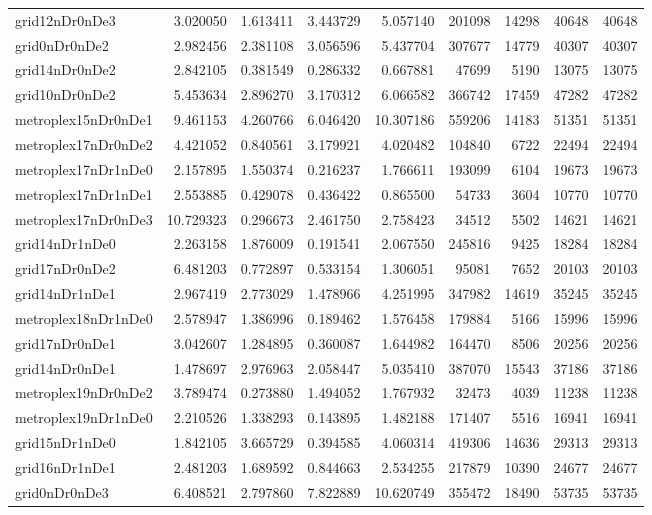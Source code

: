 \begin{longtable}{|l|r|r|r|r|r|r|r|r|}
grid12nDr0nDe3 & 3.020050 & 1.613411 & 3.443729 & 5.057140 & 201098 & 14298 & 40648 & 40648 \\
grid0nDr0nDe2 & 2.982456 & 2.381108 & 3.056596 & 5.437704 & 307677 & 14779 & 40307 & 40307 \\
grid14nDr0nDe2 & 2.842105 & 0.381549 & 0.286332 & 0.667881 & 47699 & 5190 & 13075 & 13075 \\
grid10nDr0nDe2 & 5.453634 & 2.896270 & 3.170312 & 6.066582 & 366742 & 17459 & 47282 & 47282 \\
metroplex15nDr0nDe1 & 9.461153 & 4.260766 & 6.046420 & 10.307186 & 559206 & 14183 & 51351 & 51351 \\
metroplex17nDr0nDe2 & 4.421052 & 0.840561 & 3.179921 & 4.020482 & 104840 & 6722 & 22494 & 22494 \\
metroplex17nDr1nDe0 & 2.157895 & 1.550374 & 0.216237 & 1.766611 & 193099 & 6104 & 19673 & 19673 \\
metroplex17nDr1nDe1 & 2.553885 & 0.429078 & 0.436422 & 0.865500 & 54733 & 3604 & 10770 & 10770 \\
metroplex17nDr0nDe3 & 10.729323 & 0.296673 & 2.461750 & 2.758423 & 34512 & 5502 & 14621 & 14621 \\
grid14nDr1nDe0 & 2.263158 & 1.876009 & 0.191541 & 2.067550 & 245816 & 9425 & 18284 & 18284 \\
grid17nDr0nDe2 & 6.481203 & 0.772897 & 0.533154 & 1.306051 & 95081 & 7652 & 20103 & 20103 \\
grid14nDr1nDe1 & 2.967419 & 2.773029 & 1.478966 & 4.251995 & 347982 & 14619 & 35245 & 35245 \\
metroplex18nDr1nDe0 & 2.578947 & 1.386996 & 0.189462 & 1.576458 & 179884 & 5166 & 15996 & 15996 \\
grid17nDr0nDe1 & 3.042607 & 1.284895 & 0.360087 & 1.644982 & 164470 & 8506 & 20256 & 20256 \\
grid14nDr0nDe1 & 1.478697 & 2.976963 & 2.058447 & 5.035410 & 387070 & 15543 & 37186 & 37186 \\
metroplex19nDr0nDe2 & 3.789474 & 0.273880 & 1.494052 & 1.767932 & 32473 & 4039 & 11238 & 11238 \\
metroplex19nDr1nDe0 & 2.210526 & 1.338293 & 0.143895 & 1.482188 & 171407 & 5516 & 16941 & 16941 \\
grid15nDr1nDe0 & 1.842105 & 3.665729 & 0.394585 & 4.060314 & 419306 & 14636 & 29313 & 29313 \\
grid16nDr1nDe1 & 2.481203 & 1.689592 & 0.844663 & 2.534255 & 217879 & 10390 & 24677 & 24677 \\
grid0nDr0nDe3 & 6.408521 & 2.797860 & 7.822889 & 10.620749 & 355472 & 18490 & 53735 & 53735 \\

\end{longtable}
